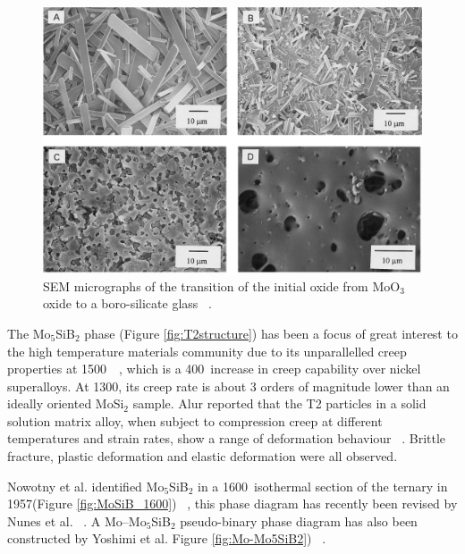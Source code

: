 \vspace{-.5cm}
%
\begin{figure}[H]
\begin{center}
\includegraphics[width=.7\textwidth]{MoSi_oxidationpictures}
\vspace{-2mm}
\caption{SEM micrographs of the transition of the initial oxide from MoO$_3$ oxide to a boro-silicate glass ~\cite{akinc99}.}\label{fig:MoSi_oxidationpictures}
\end{center}
\end{figure}
\vspace{-1cm}
%
The Mo$_5$SiB$_2$ phase (Figure \ref{fig:T2structure}) has been a focus of great interest to the high temperature materials community due to its unparallelled creep properties at 1500\celsius\ ~\cite{hayashi04, ito01}, which is a 400\celsius\ increase in creep capability over nickel superalloys.  At 1300\celsius, its creep rate is about 3 orders of magnitude lower than an ideally oriented MoSi$_2$ sample. Alur reported that the T2 particles in a solid solution matrix alloy, when subject to compression creep at different temperatures and strain rates, show a range of deformation behaviour ~\cite{alur04}. Brittle fracture, plastic deformation and elastic deformation were all observed. 

Nowotny et al. identified Mo$_5$SiB$_2$ in a 1600\celsius\ isothermal section of the ternary in 1957(Figure \ref{fig:MoSiB_1600}) ~\cite{nowotny57}, this phase diagram has recently been revised by Nunes et al. ~\cite{nunes97}. A Mo--Mo$_5$SiB$_2$ pseudo-binary phase diagram has also been constructed by Yoshimi et al. Figure \ref{fig:Mo-Mo5SiB2}) ~\cite{yoshimi03}.


